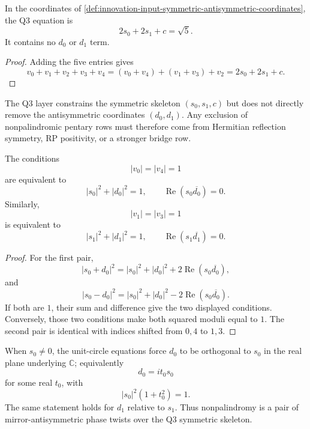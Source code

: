 \begin{theorem}
\label{thm:innovation-input-qthree-sees-symmetric-part}
In the coordinates of
\autoref{def:innovation-input-symmetric-antisymmetric-coordinates}, the
Q3 equation is
$$
2s_0+2s_1+c=\sqrt5.
$$
It contains no $d_0$ or $d_1$ term.
\end{theorem}

\begin{proof}
Adding the five entries gives
$$
v_0+v_1+v_2+v_3+v_4
=
(v_0+v_4)+(v_1+v_3)+v_2
=
2s_0+2s_1+c.
$$
\end{proof}

\begin{corollary}
\label{cor:innovation-input-nonpalindromy-not-qthree-obstruction}
The Q3 layer constrains the symmetric skeleton $(s_0,s_1,c)$ but does not
directly remove the antisymmetric coordinates $(d_0,d_1)$. Any exclusion
of nonpalindromic pentary rows must therefore come from Hermitian
reflection symmetry, RP positivity, or a stronger bridge row.
\end{corollary}

\begin{theorem}
\label{thm:innovation-input-unit-circle-mirror-coordinates}
The conditions
$$
|v_0|=|v_4|=1
$$
are equivalent to
$$
|s_0|^2+|d_0|^2=1,
\qquad
\operatorname{Re}(s_0\overline{d_0})=0.
$$
Similarly,
$$
|v_1|=|v_3|=1
$$
is equivalent to
$$
|s_1|^2+|d_1|^2=1,
\qquad
\operatorname{Re}(s_1\overline{d_1})=0.
$$
\end{theorem}

\begin{proof}
For the first pair,
$$
|s_0+d_0|^2
=
|s_0|^2+|d_0|^2+2\operatorname{Re}(s_0\overline{d_0}),
$$
and
$$
|s_0-d_0|^2
=
|s_0|^2+|d_0|^2-2\operatorname{Re}(s_0\overline{d_0}).
$$
If both are $1$, their sum and difference give the two displayed
conditions. Conversely, those two conditions make both squared moduli
equal to $1$. The second pair is identical with indices shifted from
$0,4$ to $1,3$.
\end{proof}

\begin{principle}
\label{prin:innovation-input-antisymmetric-phase-twist}
When $s_0\ne0$, the unit-circle equations force $d_0$ to be orthogonal to
$s_0$ in the real plane underlying $\mathbb C$; equivalently
$$
d_0=i t_0 s_0
$$
for some real $t_0$, with
$$
|s_0|^2(1+t_0^2)=1.
$$
The same statement holds for $d_1$ relative to $s_1$. Thus
nonpalindromy is a pair of mirror-antisymmetric phase twists over the
Q3 symmetric skeleton.
\end{principle}

